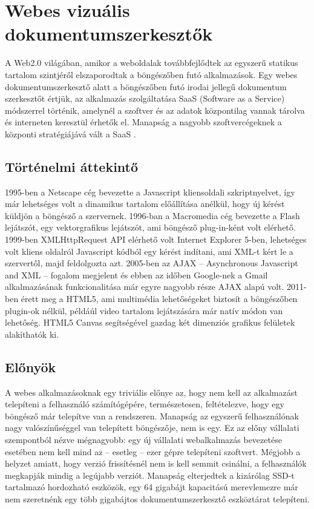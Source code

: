 \chapter{Webes vizuális dokumentumszerkesztők}

A Web2.0 világában, amikor a weboldalak továbbfejlődtek az egyszerű statikus tartalom szintjéről elszaporodtak a böngészőben futó alkalmazások. Egy webes dokumentumszerkesztő alatt a böngészőben futó irodai jellegű dokumentum szerkesztőt értjük, az alkalmazás szolgáltatása SaaS (Software as a Service) módszerrel történik, amelynél a szoftver és az adatok központilag vannak tárolva és interneten keresztül érhetők el. Manapság a nagyobb szoftvercégeknek a központi stratégiájává vált a SaaS \cite{Saasref}.

\section{Történelmi áttekintő}

1995-ben a Netscape cég bevezette a Javascript kliensoldali szkriptnyelvet, így már lehetséges volt a dinamikus tartalom előállítása anélkül, hogy új kérést küldjön a böngésző a szervernek.
1996-ban a Macromedia cég bevezette a Flash lejátszót, egy vektorgrafikus lejátszót, ami böngésző plug-in-ként volt elérhető.
1999-ben XMLHttpRequest API elérhető volt Internet Explorer 5-ben, lehetséges volt kliens oldalról Javascript kódból egy kérést indítani, ami XML-t kért le a szervertől, majd feldolgozta azt.
2005-ben az AJAX -- Asynchronous Javascript and XML -- fogalom megjelent \cite{ajax} és ebben az időben Google-nek a Gmail alkalmazásának  funkcionalitása már egyre nagyobb része AJAX alapú volt.
2011-ben érett meg a HTML5, ami multimédia lehetőségeket biztosít a böngészőben plugin-ok nélkül, példáúl video tartalom lejátszására már natív módon van lehetőség. HTML5 Canvas segítségével gazdag két dimenziós grafikus felületek alakíthatók ki. 

\section{Előnyök}

A webes alkalmazásoknak egy triviális előnye az, hogy nem kell az alkalmazást telepíteni a felhasználó számítógépére, természetesen, feltételezve, hogy egy böngésző már telepítve van a rendszeren. Manapság az egyszerű felhasználónak nagy valószínűséggel van telepített böngészője, nem is egy. Ez az előny vállalati szempontból nézve mégnagyobb: egy új vállalati webalkalmazás bevezetése esetében nem kell mind az -- esetleg -- ezer gépre telepíteni szoftvert.
Mégjobb a helyzet amiatt, hogy verzió frissítésnél nem is kell semmit csinálni, a felhasználók megkapják mindig a legújabb verziót. Manapság elterjedtek a kizárólag SSD-t tartalmazó hordozható eszközök, egy 64 gigabájt kapacitású merevlemezre már nem szeretnénk egy több gigabájtos dokumentumszerkesztő eszköztárat telepíteni.

